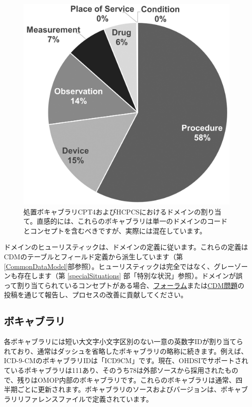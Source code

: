 \documentclass[
  11pt]{book}
\theoremstyle{definition}
\theoremstyle{definition}
\theoremstyle{definition}
\theoremstyle{definition}
\theoremstyle{remark}
\begin{document}
\begin{figure}

{\centering \includegraphics[width=0.7\linewidth]{images/StandardizedVocabularies/domains} 

}

\caption{処置ボキャブラリCPT4およびHCPCSにおけるドメインの割り当て。直感的には、これらのボキャブラリは単一のドメインのコードとコンセプトを含むべきですが、実際には混在しています。}\label{fig:domains}
\end{figure}

ドメインのヒューリスティックは、ドメインの定義に従います。これらの定義はCDMのテーブルとフィールド定義から派生しています（第 \ref{CommonDataModel}部参照）。ヒューリスティックは完全ではなく、グレーゾーンも存在します（第 \ref{specialSituations} 部「特別な状況」参照）。ドメインが誤って割り当てられているコンセプトがある場合、\href{https://forums.ohdsi.org}{フォーラム}または\href{https://github.com/OHDSI/CommonDataModel/issues}{CDM問題}の投稿を通じて報告し、プロセスの改善に貢献してください。

\subsection{ボキャブラリ}\label{ux30dcux30adux30e3ux30d6ux30e9ux30ea}

各ボキャブラリには短い大文字小文字区別のない一意の英数字IDが割り当てられており、通常はダッシュを省略したボキャブラリの略称に続きます。例えば、ICD-9-CMのボキャブラリIDは「ICD9CM」です。現在、OHDSIでサポートされているボキャブラリは111あり、そのうち78は外部ソースから採用されたもので、残りはOMOP内部のボキャブラリです。これらのボキャブラリは通常、四半期ごとに更新されます。ボキャブラリのソースおよびバージョンは、ボキャブラリリファレンスファイルで定義されています。 
\end{document}
